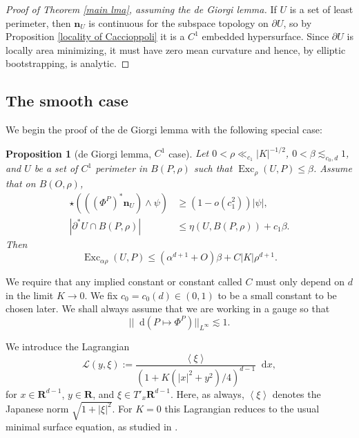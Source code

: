 \documentclass[reqno,10pt]{amsart}
\newcommand{\RR}{\mathbf{R}}
\DeclareMathOperator{\Exc}{Exc}
\newcommand*\dif{\mathop{}\!\mathrm{d}}
\newcommand{\Lagrange}{\mathscr L}
\newcommand{\normal}{\mathbf n}
\def\Japan#1{\left \langle #1 \right \rangle}
\newtheorem{proposition}[theorem]{Proposition}
\theoremstyle{definition}
\numberwithin{equation}{section}
\begin{document}
\begin{proof}[Proof of Theorem \ref{main lma}, assuming the de Giorgi lemma]
If $U$ is a set of least perimeter, then $\normal_U$ is continuous for the subspace topology on $\partial U$, so by Proposition \ref{locality of Caccioppoli} it is a $C^1$ embedded hypersurface.
Since $\partial U$ is locally area minimizing, it must have zero mean curvature and hence, by elliptic bootstrapping, is analytic.
\end{proof}


\subsection{The smooth case}
We begin the proof of the de Giorgi lemma with the following special case:

\begin{proposition}[de Giorgi lemma, $C^1$ case]\label{Miranda44}
Let $0 < \rho \ll_{c_1} |K|^{-1/2}$, $0 < \beta \lesssim_{c_0, d} 1$, and $U$ be a set of $C^1$ perimeter in $B(P, \rho)$ such that $\Exc_\rho (U, P) \leq \beta$.
Assume that on $B(O, \rho)$,
\begin{align}
\star(((\Phi^P)^* \normal_U) \wedge \psi) &\geq (1 - o(c_1^2)) |\psi|, \label{Miranda44 normal hyp} \\
|\partial^* U \cap B(P, \rho)| &\leq \eta(U, B(P, \rho)) + c_1 \beta. \label{Miranda44 minimality hyp}
\end{align}
Then
\begin{equation}\label{Miranda44 concl}
\Exc_{\alpha \rho} (U, P) \leq (\alpha^{d + 1} + O) \beta + C|K|\rho^{d + 1}.
\end{equation}
\end{proposition}

We require that any implied constant or constant called $C$ must only depend on $d$ in the limit $K \to 0$.
We fix $c_0 = c_0(d) \in (0, 1)$ to be a small constant to be chosen later.
We shall always assume that we are working in a gauge so that
\begin{equation}\label{oscillation of isometries}
||\dif(P \mapsto \Phi^P)||_{L^\infty} \lesssim 1.
\end{equation}

We introduce the Lagrangian
$$\Lagrange(y, \xi) := \frac{\Japan{\xi}}{(1 + K(|x|^2 + y^2)/4)^{d - 1}} \dif x,$$
for $x \in \RR^{d - 1}$, $y \in \RR$, and $\xi \in T'_x \RR^{d - 1}$.
Here, as always, $\Japan \xi$ denotes the Japanese norm $\sqrt{1 + |\xi|^2}$.
For $K = 0$ this Lagrangian reduces to the usual minimal surface equation, as studied in \cite[\S6]{Giusti77}.
\end{document}
